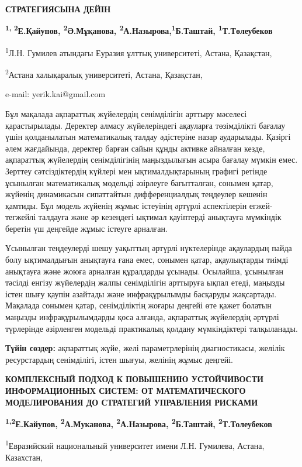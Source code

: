 \textbf{СТРАТЕГИЯСЫНА ДЕЙІН}

\textbf{\textsuperscript{1, 2}Е.Қайупов, \textsuperscript{2}Ә.Мұқанова,
\textsuperscript{2}А.Назырова,\textsuperscript{1}Б.Таштай,
\textsuperscript{1}Т.Төлеубеков}

\textsuperscript{1}Л.Н. Гумилев атындағы Еуразия ұлттық университеті,
Астана, Қазақстан,

\textsuperscript{2}Астана халықаралық университеті, Астана, Қазақстан,

e-mail: yerik.kai@gmail.com

Бұл мақалада ақпараттық жүйелердің сенімділігін арттыру мәселесі
қарастырылады. Деректер алмасу жүйелеріндегі ақауларға төзімділікті
бағалау үшін қолданылатын математикалық талдау әдістеріне назар
аударылады. Қазіргі әлем жағдайында, деректер барған сайын құнды активке
айналған кезде, ақпараттық жүйелердің сенімділігінің маңыздылығын асыра
бағалау мүмкін емес. Зерттеу сәтсіздіктердің күйлері мен
ықтималдықтарының графигі ретінде ұсынылған математикалық модельді
әзірлеуге бағытталған, сонымен қатар, жүйенің динамикасын сипаттайтын
дифференциалдық теңдеулер кешенін қамтиды. Бұл модель жүйенің жұмыс
істеуінің әртүрлі аспектілерін егжей-тегжейлі талдауға және әр кезеңдегі
ықтимал қауіптерді анықтауға мүмкіндік беретін үш деңгейде жұмыс істеуге
арналған.

Ұсынылған теңдеулерді шешу уақыттың әртүрлі нүктелерінде ақаулардың
пайда болу ықтималдығын анықтауға ғана емес, сонымен қатар, ақаулықтарды
тиімді анықтауға және жоюға арналған құралдарды ұсынады. Осылайша,
ұсынылған тәсілді енгізу жүйелердің жалпы сенімділігін арттыруға ықпал
етеді, маңызды істен шығу қаупін азайтады және инфрақұрылымды басқаруды
жақсартады. Мақалада сонымен қатар, сенімділіктің жоғары деңгейі өте
қажет болатын маңызды инфрақұрылымдарды қоса алғанда, ақпараттық
жүйелердің әртүрлі түрлерінде әзірленген модельді практикалық қолдану
мүмкіндіктері талқыланады.

\textbf{Түйін сөздер:} ақпараттық жүйе, желі параметрлерінің
диагностикасы, желілік ресурстардың сенімділігі, істен шығуы, желінің
жұмыс деңгейі.

\textbf{КОМПЛЕКСНЫЙ ПОДХОД К ПОВЫШЕНИЮ УСТОЙЧИВОСТИ ИНФОРМАЦИОННЫХ
СИСТЕМ: ОТ МАТЕМАТИЧЕСКОГО МОДЕЛИРОВАНИЯ ДО СТРАТЕГИЙ УПРАВЛЕНИЯ
РИСКАМИ}

\textbf{\textsuperscript{1,2}Е.Кайупов, \textsuperscript{2}А.Муканова,
\textsuperscript{2}А.Назырова, \textsuperscript{2}Б.Таштай,
\textsuperscript{2}Т.Толеубеков}

\textsuperscript{1}Евразийский национальный университет имени Л.Н.
Гумилева, Астана, Казахстан,

